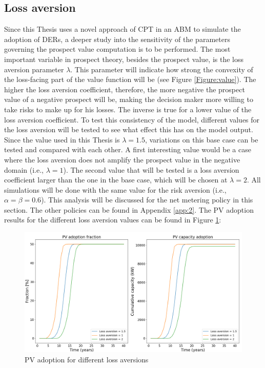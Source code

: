 \subsection{Loss aversion}
Since this Thesis uses a novel approach of CPT in an ABM to simulate the adoption of DERs, a deeper study into the sensitivity of the parameters governing the prospect value computation is to be performed. The most important variable in prospect theory, besides the prospect value, is the loss aversion parameter $\lambda$. This parameter will indicate how strong the convexity of the loss-facing part of the value function will be (see Figure \ref{Figure:value}). The higher the loss aversion coefficient, therefore, the more negative the prospect value of a negative prospect will be, making the decision maker more willing to take risks to make up for his losses. The inverse is true for a lower value of the loss aversion coefficient. To test this consistency of the model, different values for the loss aversion will be tested to see what effect this has on the model output. Since the value used in this Thesis is $\lambda = 1.5$, variations on this base case can be tested and compared with each other. A first interesting value would be a case where the loss aversion does not amplify the prospect value in the negative domain (i.e., $\lambda = 1$). The second value that will be tested is a loss aversion coefficient larger than the one in the base case, which will be chosen at $\lambda = 2$.  All simulations will be done with the same value for the risk aversion (i.e., $\alpha = \beta = 0.6$). This analysis will be discussed for the net metering policy in this section. The other policies can be found in Appendix \ref{app:2}. 
\newline \newline \noindent
The PV adoption results for the different loss aversion values can be found in Figure \ref{Figure:PVlossvol}: 
\begin{figure}[h!]
\centering
\includegraphics[width=12cm]{ModelAnalysis/PVloss.png}
\caption{PV adoption for different loss aversions}
\label{Figure:PVlossvol}
\end{figure}
